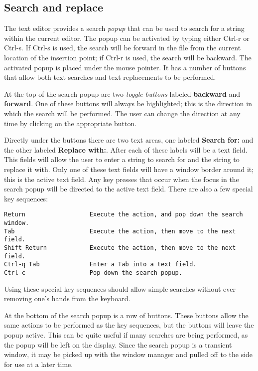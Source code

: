 \begin{sloppypar}
\subsection{Search and replace}


The text editor provides a search {\it popup} that can be used to
search for a string within the current editor. The popup can be
activated by typing either Ctrl-r or Ctrl-s. If Ctrl-s is used, the
search will be forward in the file from the current location of the
insertion point; if Ctrl-r is used, the search will be backward.  The
activated popup is placed under the mouse pointer.  It has a number of
buttons that allow both text searches and text replacements to be
performed.

   At the top of the search popup are two {\it toggle buttons} labeled
{\bf backward} and {\bf forward}.  One of these buttons will always be
highlighted; this is the direction in which the search will be
performed. The user can change the direction at any time by clicking
on the appropriate button.

   Directly under the buttons there are two text areas, one labeled
{\bf Search for:} and the other labeled {\bf Replace with:}. After
each of these labels will be a text field. This fields will allow the
user to enter a string to search for and the string to replace it
with. Only one of these text fields will have a window border around
it; this is the active text field. Any key presses that occur when the
focus in the search popup will be directed to the active text
field. There are also a few special key sequences:

\begin{verbatim}
Return                  Execute the action, and pop down the search window.
Tab                     Execute the action, then move to the next field.
Shift Return            Execute the action, then move to the next field.
Ctrl-q Tab              Enter a Tab into a text field.
Ctrl-c                  Pop down the search popup.
\end{verbatim}

   Using these special key sequences should allow simple searches
without ever removing one's hands from the keyboard.

   At the bottom of the search popup is a row of buttons. These
buttons allow the same actions to be performed as the key sequences,
but the buttons will leave the popup active. This can be quite useful
if many searches are being performed, as the popup will be left on the
display.  Since the search popup is a transient window, it may be
picked up with the window manager and pulled off to the side for use
at a later time.


\end{sloppypar}
